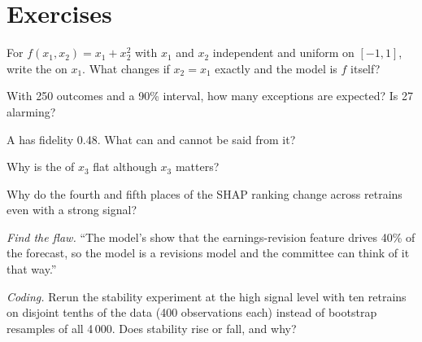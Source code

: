 \section{Exercises}

\begin{exercise}[$\star$]\label{exo:ml:interpretability-and-model-governance:1}
For $f(x_1, x_2) = x_1 + x_2^2$ with $x_1$ and $x_2$ independent and uniform on $[-1, 1]$, write the  on
$x_1$. What changes if $x_2 = x_1$ exactly and the model is $f$ itself?
\end{exercise}

\begin{exercise}[$\star$]\label{exo:ml:interpretability-and-model-governance:2}
With 250 outcomes and a 90\% interval, how many exceptions are expected? Is 27 alarming?
\end{exercise}

\begin{exercise}[$\star$]\label{exo:ml:interpretability-and-model-governance:3}
A  has fidelity 0.48. What can and cannot be said from it?
\end{exercise}

\begin{exercise}[$\star\star$]\label{exo:ml:interpretability-and-model-governance:4}
Why is the  of $x_3$ flat although $x_3$ matters?
\end{exercise}

\begin{exercise}[$\star\star$]\label{exo:ml:interpretability-and-model-governance:5}
Why do the fourth and fifth places of the SHAP ranking change across retrains even with a strong signal?
\end{exercise}

\begin{exercise}[$\star\star$]\label{exo:ml:interpretability-and-model-governance:6}
\emph{Find the flaw.} ``The model's  show that the earnings-revision feature drives 40\% of the forecast, so the
model is a revisions model and the committee can think of it that way.''
\end{exercise}

\begin{exercise}[$\star\star\star$]\label{exo:ml:interpretability-and-model-governance:7}
\emph{Coding.} Rerun the stability experiment at the high signal level with ten retrains on disjoint tenths of the data
(400 observations each) instead of bootstrap resamples of all 4\,000. Does stability rise or fall, and why?
\end{exercise}


